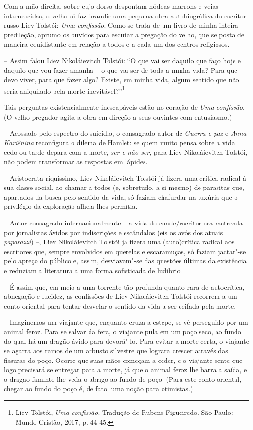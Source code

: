 Com a mão direita, sobre cujo dorso despontam nódoas marrons e veias
intumescidas, o velho só faz brandir uma pequena obra autobiográfica do
escritor russo Liev Tolstói: \emph{Uma confissão}. Como se trata de um
livro de minha inteira predileção, aprumo os ouvidos para escutar a
pregação do velho, que se posta de maneira equidistante em relação a
todos e a cada um dos centros religiosos.

-- Assim falou Liev Nikoláievitch Tolstói: ``O que vai ser daquilo que
faço hoje e daquilo que vou fazer amanhã -- o que vai ser de toda a
minha vida? Para que devo viver, para que fazer algo? Existe, em minha
vida, algum sentido que não seria aniquilado pela morte
inevitável?''\footnote{Liev Tolstói, \emph{Uma confissão}. Tradução de
  Rubens Figueiredo. São Paulo: Mundo Cristão, 2017, p. 44-45.}

Tais perguntas existencialmente inescapáveis estão no coração de
\emph{Uma confissão}. (O velho pregador agita a obra em direção a seus
ouvintes com entusiasmo.)

-- Acossado pelo espectro do suicídio, o consagrado autor de
\emph{Guerra e paz} e \emph{Anna Kariênina} reconfigura o dilema de
Hamlet: se quem muito pensa sobre a vida cedo ou tarde depara com a
morte, \emph{ser e não ser}, para Liev Nikoláievitch Tolstói, não podem
transformar as respostas em lápides.

-- Aristocrata riquíssimo, Liev Nikoláievitch Tolstói já fizera uma
crítica radical à sua classe social, ao chamar a todos (e, sobretudo, a
si mesmo) de parasitas que, apartados da busca pelo sentido da vida, só
faziam chafurdar na luxúria que o privilégio da exploração alheia lhes
permitia.

-- Autor consagrado internacionalmente -- a vida do conde/escritor era
rastreada por jornalistas ávidos por indiscrições e escândalos (eis os
avós dos atuais \emph{paparazzi}) --, Liev Nikoláievitch Tolstói já
fizera uma (auto)crítica radical aos escritores que, sempre envolvidos
em querelas e escaramuças, só faziam jactar"-se pelo apreço do público e,
assim, desviavam"-se das questões últimas da existência e reduziam a
literatura a uma forma sofisticada de ludibrio.

-- É assim que, em meio a uma torrente tão profunda quanto rara de
autocrítica, abnegação e lucidez, as confissões de Liev Nikoláievitch
Tolstói recorrem a um conto oriental para tentar desvelar o sentido da
vida a ser ceifada pela morte.

-- Imaginemos um viajante que, enquanto cruza a estepe, se vê perseguido
por um animal feroz. Para se salvar da fera, o viajante pula em um poço
seco, ao fundo do qual há um dragão ávido para devorá"-lo. Para evitar a
morte certa, o viajante se agarra aos ramos de um arbusto silvestre que
lograra crescer através das fissuras do poço. Ocorre que suas mãos
começam a ceder, e o viajante sente que logo precisará se entregar para
a morte, já que o animal feroz lhe barra a saída, e o dragão faminto lhe
veda o abrigo ao fundo do poço. (Para este conto oriental, chegar ao
fundo do poço é, de fato, uma noção para otimistas.)

